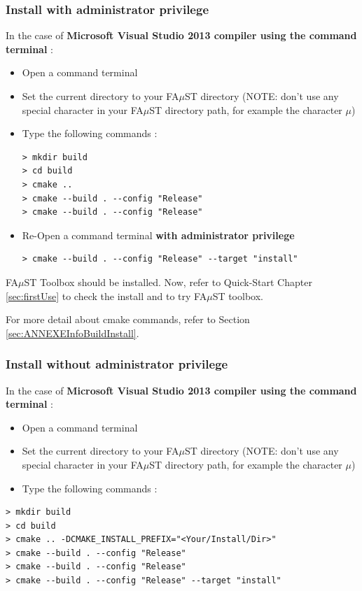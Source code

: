 \subsubsection{Install with administrator privilege}
\label{sec:AdminWinVisualStudioTerminalBasicInstall}
In the case of \textbf{Microsoft Visual Studio 2013 compiler using the command terminal} :
\begin{itemize}
\item Open a command terminal
\item Set the current directory to your FA$\mu$ST directory (NOTE: don't use any special character in your FA$\mu$ST directory path, for example the character $\mu$)
\item Type the following commands : 

\lstset{style=customBash}
\begin{lstlisting}
> mkdir build
> cd build
> cmake ..
> cmake --build . --config "Release"
> cmake --build . --config "Release"
\end{lstlisting}

\item Re-Open a command terminal \textbf{with administrator privilege} 
\lstset{style=customBash}
\begin{lstlisting}
> cmake --build . --config "Release" --target "install"
\end{lstlisting}
\end{itemize}

FA$\mu$ST Toolbox should be installed. Now, refer to Quick-Start Chapter \ref{sec:firstUse} to check the install and to try FA$\mu$ST toolbox.

For more detail about cmake commands, refer to Section \ref{sec:ANNEXEInfoBuildInstall}.

\subsubsection{Install without administrator privilege}
\label{sec:NoAdminWinVisualStudioTerminalBasicInstall}

In the case of \textbf{Microsoft Visual Studio 2013 compiler using the command terminal} :
\begin{itemize}
\item Open a command terminal
\item Set the current directory to your FA$\mu$ST directory (NOTE: don't use any special character in your FA$\mu$ST directory path, for example the character $\mu$)
\item Type the following commands : 
\end{itemize}
\lstset{style=customBash}
\begin{lstlisting}
> mkdir build
> cd build
> cmake .. -DCMAKE_INSTALL_PREFIX="<Your/Install/Dir>" 
> cmake --build . --config "Release"
> cmake --build . --config "Release"
> cmake --build . --config "Release" --target "install"
\end{lstlisting}


